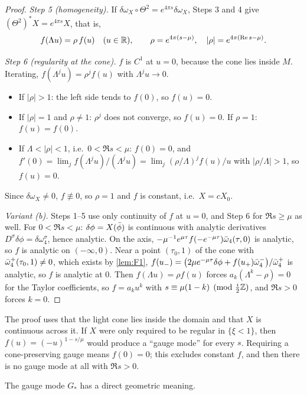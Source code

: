 \begin{proof}
\emph{Step 5 (homogeneity).} If $\delta\omega_X\circ\Theta^2=e^{4\pi s}\delta\omega_X$, Steps 3 and 4 give
$(\Theta^2)^*X=e^{4\pi s}X$, that is,
\[
  f(\Lambda u)=\rho\,f(u)\quad(u\in\mathbb{R}),\qquad \rho=e^{4\pi(s-\mu)},\quad |\rho|=e^{4\pi(\operatorname{Re} s-\mu)}.
\]

\emph{Step 6 (regularity at the cone).} $f$ is $C^1$ at $u=0$, because the cone lies inside $M$. Iterating,
$f(\Lambda^ju)=\rho^jf(u)$ with $\Lambda^ju\to0$.
\begin{itemize}[leftmargin=*]
\item If $|\rho|>1$: the left side tends to $f(0)$, so $f(u)=0$.
\item If $|\rho|=1$ and $\rho\neq1$: $\rho^j$ does not converge, so $f(u)=0$. If $\rho=1$: $f(u)=f(0)$.
\item If $\Lambda<|\rho|<1$, i.e.\ $0<\Re s<\mu$: $f(0)=0$, and
  $f'(0)=\lim_jf(\Lambda^ju)/(\Lambda^ju)=\lim_j(\rho/\Lambda)^jf(u)/u$ with $|\rho/\Lambda|>1$, so $f(u)=0$.
\end{itemize}
Since $\delta\omega_X\neq0$, $f\not\equiv0$, so $\rho=1$ and $f$ is constant, i.e.\ $X=cX_0$.

\emph{Variant (b).} Steps 1--5 use only continuity of $f$ at $u=0$, and Step 6 for $\Re s\ge\mu$ as well.
For $0<\Re s<\mu$: $\delta\phi=X(\bar\phi)$ is continuous with analytic derivatives
$D^\sigma\delta\phi=\delta\omega_4^\sigma$, hence analytic. On the axis,
$-\mu^{-1}e^{\mu\tau}f(-e^{-\mu\tau})\bar\omega_4(\tau,0)$ is analytic, so $f$ is analytic on $(-\infty,0)$.
Near a point $(\tau_0,1)$ of the cone with $\bar\omega_4^+(\tau_0,1)\neq0$, which exists by \cref{lem:F1},
$f(u_-)=\big(2\mu e^{-\mu\tau}\delta\phi+f(u_+)\bar\omega_4^-\big)/\bar\omega_4^+$ is analytic, so $f$ is analytic
at $0$. Then $f(\Lambda u)=\rho f(u)$ forces $a_k(\Lambda^k-\rho)=0$ for the Taylor coefficients, so
$f=a_ku^k$ with $s\equiv\mu(1-k)\pmod{\tfrac i2\mathbb{Z}}$, and $\Re s>0$ forces $k=0$.
\end{proof}

\begin{remark}\label{rem:cone-role}
The proof uses that the light cone lies inside the domain and that $X$ is continuous across it. If $X$ were
only required to be regular in $\{\xi<1\}$, then $f(u)=(-u)^{1-s/\mu}$ would produce a ``gauge mode'' for
every $s$. Requiring a cone-preserving gauge means $f(0)=0$; this excludes constant $f$, and then there is
no gauge mode at all with $\Re s>0$.
\end{remark}

The gauge mode $G_*$ has a direct geometric meaning.

